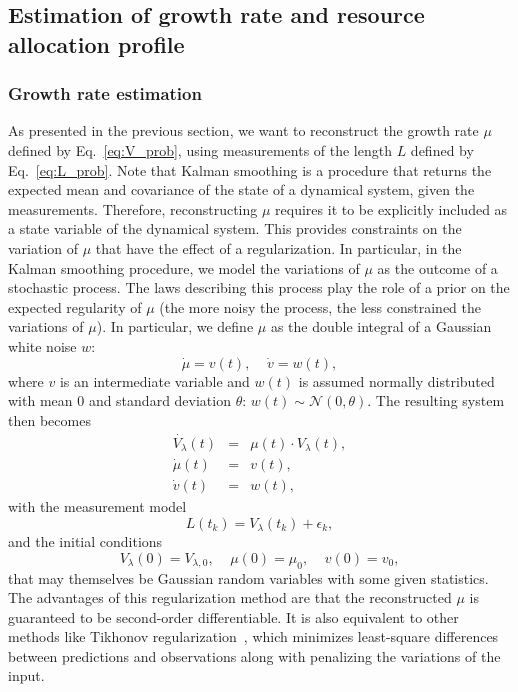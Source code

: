 \subsection{Estimation of growth rate and resource allocation profile}

\subsubsection*{Growth rate estimation}

As presented in the previous section, we want to reconstruct the growth rate $\mu$ defined by Eq.~\ref{eq:V_prob}, using measurements of the length $L$ defined by Eq.~\ref{eq:L_prob}.
Note that Kalman smoothing is a procedure that returns the expected mean and covariance of the state of a dynamical system, given the  measurements.
Therefore, reconstructing $\mu$ requires it to be explicitly included as a state variable of the dynamical system.
This provides constraints on the variation of $\mu$ that have the effect of a regularization.
In particular, in the Kalman smoothing procedure, we model the variations of $\mu$ as the outcome of a stochastic process.
The laws describing this process play the role of a prior on the expected regularity of $\mu$ (the more noisy the process, the less constrained the variations of $\mu$).
In particular, we define $\mu$ as the double integral of a Gaussian white noise $w$:
\[
\dot{\mu} = v(t), \;\;\;\; \dot{v} = w(t),
\]
where $v$ is an intermediate variable and $w(t)$ is assumed normally distributed with mean 0 and standard deviation $\theta$: $w(t) \sim \mathcal{N}(0, \theta)$.
The resulting system then becomes
\begin{eqnarray}
\dot{V_\lambda}(t) &=& \mu (t) \cdot V_\lambda (t),\nonumber\\
\dot{\mu}(t) &=& v(t),\label{eq:full_mu_prob}\\
\dot{v}(t) &=& w(t),\nonumber
\end{eqnarray}
with the measurement model
\begin{equation}
L(t_k) = V_\lambda(t_k) + \epsilon_k,
\end{equation}
and the initial conditions
\[
V_\lambda (0) = V_{\lambda,0}, \;\;\;\; \mu (0) = \mu_0 , \;\;\;\; v(0) = v_0,
\]
that may themselves be Gaussian random variables with some given statistics.
The advantages of this regularization method are that the reconstructed $\mu$ is guaranteed to be second-order differentiable.
It is also equivalent to other methods like Tikhonov regularization~\cite{tikhonov1977solutions,tikhonov1963solution,de_nicolao_nonparametric_1997}, which minimizes least-square differences between predictions and observations along with penalizing the variations of the input.

